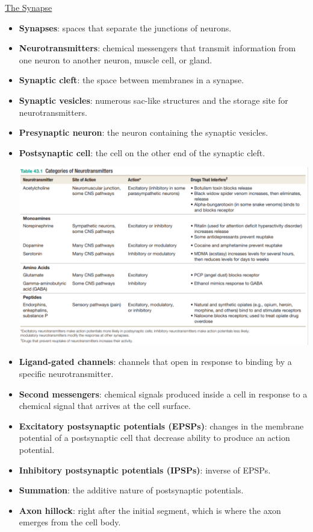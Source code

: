 \documentclass[12pt,letterpaper]{article}
\begin{document}
\hypertarget{43.3}{}
\begin{secbox}{\hyperlink{43}{The Synapse}}{
    \begin{itemize}
        \item \textbf{Synapses}: spaces that separate the junctions of neurons. 
        \item \textbf{Neurotransmitters}: chemical messengers that transmit information from one neuron to another neuron, muscle cell, or gland. 
        \item \textbf{Synaptic cleft}: the space between membranes in a synapse.
        \item \textbf{Synaptic vesicles}: numerous sac-like structures and the storage site for neurotransmitters.
        \item \textbf{Presynaptic neuron}: the neuron containing the synaptic vesicles.
        \item \textbf{Postsynaptic cell}: the cell on the other end of the synaptic cleft.\par 
        \includegraphics[width=\linewidth]{images/tab43-1.png}
        \item \textbf{Ligand-gated channels}: channels that open in response to binding by a specific neurotransmitter.
        \item \textbf{Second messengers}: chemical signals produced inside a cell in response to a chemical signal that arrives at the cell surface.
        \item \textbf{Excitatory postsynaptic potentials (EPSPs)}: changes in the membrane potential of a postsynaptic cell that decrease ability to produce an action potential.
        \item \textbf{Inhibitory postsynaptic potentials (IPSPs)}: inverse of EPSPs.
        \item \textbf{Summation}: the additive nature of postsynaptic potentials.
        \item \textbf{Axon hillock}: right after the initial segment, which is where the axon emerges from the cell body.  
    \end{itemize}
}\end{secbox}
\end{document}
